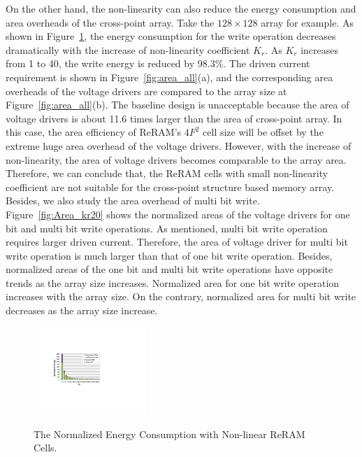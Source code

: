 On the other hand, the non-linearity can also reduce the energy consumption and area overheads of the cross-point array. Take the $128 \times 128$ array for example. As shown in Figure~\ref{fig:non_linear_energy}, the energy consumption for the write operation decreases dramatically with the increase of non-linearity coefficient $K_r$. As $K_r$ increases from 1 to 40, the write energy is reduced by 98.3\%. The driven current requirement is shown in Figure~\ref{fig:area_all}(a), and the corresponding area overheads of the voltage drivers are compared to the array size at Figure~\ref{fig:area_all}(b). The baseline design is unacceptable because the area of voltage drivers is about 11.6 times larger than the area of cross-point array. In this case, the area efficiency of ReRAM's $4F^2$ cell size will be offset by the extreme huge area overhead of the voltage drivers. However, with the increase of non-linearity, the area of voltage drivers becomes comparable to the array area. Therefore, we can conclude that, the ReRAM cells with small non-linearity coefficient are not suitable for the cross-point structure based memory array. Besides, we also study the area overhead of multi bit write. Figure~\ref{fig:Area_kr20} shows the normalized areas of the voltage drivers for one bit and multi bit write operations. As mentioned, multi bit write operation requires larger driven current. Therefore, the area of voltage driver for multi bit write operation is much larger than that of one bit write operation. Besides, normalized areas of the one bit and multi bit write operations have opposite trends as the array size increases. Normalized area for one bit write operation increases with the array size. On the contrary, normalized area for multi bit write decreases as the array size increase.

\begin{figure}%
\centering
  \includegraphics[width=0.38\textwidth]{./figures/non_linear_energy.pdf}\\
  \caption{The Normalized Energy Consumption with Non-linear ReRAM Cells.}\label{fig:non_linear_energy}
\end{figure}

